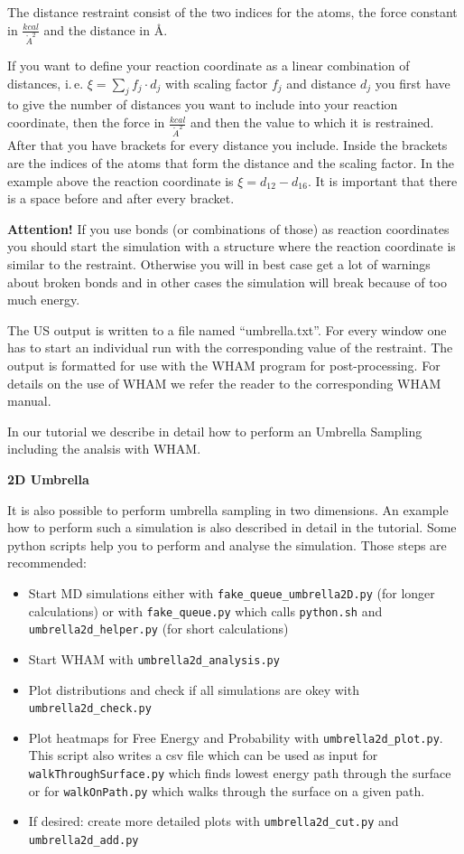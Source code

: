 \documentclass[10pt,a4paper]{article} %
\begin{document}
	The distance restraint consist of the two indices for the atoms, the force constant in $\frac{kcal}{{\mathring{A}}^2}$ and the distance in \AA.
	
	If you want to define your reaction coordinate as a linear combination of distances, i.\,e. $\xi = \sum_j f_j \cdot d_j$ with scaling factor $f_j$ and distance $d_j$ you first have to give the number of distances you want to include into your reaction coordinate, then the force in $\frac{kcal}{{\mathring{A}}^2}$ and then the value to which it is restrained. After that you have brackets for every distance you include. Inside the brackets are the indices of the atoms that form the distance and the scaling factor. In the example above the reaction coordinate is $\xi = d_{12} - d_{16}$. It is important that there is a space before and after every bracket.
	
	\textbf{Attention!} If you use bonds (or combinations of those) as reaction coordinates you should start the simulation with a structure where the reaction coordinate is similar to the restraint. Otherwise you will in best case get a lot of warnings about broken bonds and in other cases the simulation will break because of too much energy.
	
	The \acl{US} output is written to a file named ``umbrella.txt''. For every window one has to start an individual run with the corresponding value of the restraint. The output is formatted for use with the \ac{WHAM} program\supercite{wham1, wham2} for post-processing. For details on the use of WHAM we refer the reader to the corresponding \ac{WHAM} manual.
	
	In our tutorial we describe in detail how to perform an Umbrella Sampling including the analsis with WHAM.
	
	\textbf{2D Umbrella}
	
	It is also possible to perform umbrella sampling in two dimensions. An example how to perform such a simulation is also described in detail in the tutorial. Some python scripts help you to perform and analyse the simulation. Those steps are recommended:
	
	\begin{itemize}
		\item Start MD simulations either with \texttt{fake\_queue\_umbrella2D.py} (for longer calculations) or with \texttt{fake\_queue.py} which calls \texttt{python.sh} and \texttt{umbrella2d\_helper.py} (for short calculations)
		\item Start WHAM with \texttt{umbrella2d\_analysis.py}
		\item Plot distributions and check if all simulations are okey with \texttt{umbrella2d\_check.py}
		\item Plot heatmaps for Free Energy and Probability with \texttt{umbrella2d\_plot.py}. This script also writes a csv file which can be used as input for \texttt{walkThroughSurface.py} which finds lowest energy path through the surface or for \texttt{walkOnPath.py} which walks through the surface on a given path.
		\item If desired: create more detailed plots with \texttt{umbrella2d\_cut.py} and \texttt{umbrella2d\_add.py}
	\end{itemize}
\end{document}
